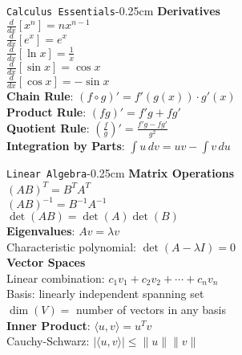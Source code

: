 \documentclass[10pt,3col]{cheatsheet}
\begin{document}
\begin{multicols}{3}

\begin{cheatsheetbox}{\texttt{Calculus Essentials}}{-0.25cm}
    \textbf{Derivatives}\\
    $\frac{d}{dx}[x^n] = nx^{n-1}$\\
    $\frac{d}{dx}[e^x] = e^x$\\
    $\frac{d}{dx}[\ln x] = \frac{1}{x}$\\
    $\frac{d}{dx}[\sin x] = \cos x$\\
    $\frac{d}{dx}[\cos x] = -\sin x$\\
    \textbf{Chain Rule}: $(f \circ g)' = f'(g(x)) \cdot g'(x)$\\
    \textbf{Product Rule}: $(fg)' = f'g + fg'$\\
    \textbf{Quotient Rule}: $\left(\frac{f}{g}\right)' = \frac{f'g - fg'}{g^2}$\\
    \textbf{Integration by Parts}: $\int u \, dv = uv - \int v \, du$
\end{cheatsheetbox}

\begin{cheatsheetbox}{\texttt{Linear Algebra}}{-0.25cm}
    \textbf{Matrix Operations}\\
    $(AB)^T = B^T A^T$\\
    $(AB)^{-1} = B^{-1}A^{-1}$\\
    $\det(AB) = \det(A)\det(B)$\\
    \textbf{Eigenvalues}: $Av = \lambda v$\\
    Characteristic polynomial: $\det(A - \lambda I) = 0$\\
    \textbf{Vector Spaces}\\
    Linear combination: $c_1v_1 + c_2v_2 + \cdots + c_nv_n$\\
    Basis: linearly independent spanning set\\
    $\dim(V) = $ number of vectors in any basis\\
    \textbf{Inner Product}: $\langle u,v \rangle = u^T v$\\
    Cauchy-Schwarz: $|\langle u,v \rangle| \leq \|u\|\|v\|$
\end{cheatsheetbox}


\end{multicols}
\end{document}

